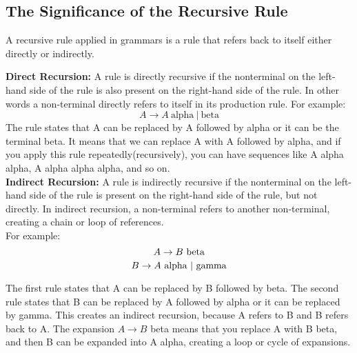 \subsection{The Significance of the Recursive Rule}
A recursive rule applied in grammars is a rule that refers back to itself either directly or indirectly.

\textbf{Direct Recursion:} A rule is directly recursive if the nonterminal on the left-hand side of the rule is also present on the right-hand side of the rule. In other words a non-terminal directly refers to itself in its production rule. 
For example: 
$$ A \rightarrow A \ \text{alpha} \ | \ \text{beta} $$ The rule states that A can be replaced by A followed by alpha or it can be the terminal beta.
It means that we can replace A with A followed by alpha, and if you apply this rule repeatedly(recursively), you can have sequences like A alpha alpha, A alpha alpha alpha, and so on. \\ 

\textbf{Indirect Recursion:} A rule is indirectly recursive if the nonterminal on the left-hand side of the rule is present on the right-hand side of the rule, but not directly. In indirect recursion, a non-terminal refers to another non-terminal, creating a chain or loop of references. \\
For example: 
$$ A \rightarrow B \ \textnormal{beta} $$
$$ B \rightarrow A \ \textnormal{alpha} \ | \ \textnormal{gamma} $$

The first rule states that A can be replaced by B followed by beta. The second rule states that B can be replaced by A followed by alpha or it can be replaced by gamma.
This creates an indirect recursion, because A refers to B and B refers back to A. The expansion $A \rightarrow B$ beta means that you replace A with B beta, and then B can be expanded into A alpha, creating a loop or cycle of expansions.



